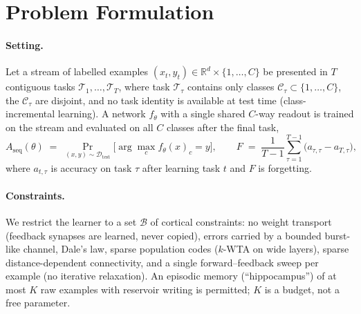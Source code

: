 \documentclass{article}
\newcommand{\kwta}{$k$-WTA}
\begin{document}
\begin{abstract}
and gives way to the backpropagation references at large ones. On split CIFAR-10 the system
leads offline rehearsal and BP+ER but trails ER-ACE and DER++ by two to three points, and a
substrate decomposition on feature inputs attributes the gap to BP+ER to dense activation
rather than to credit assignment. The construction is not tied to the local learner: on a
backpropagation network with $k$-winner-take-all hidden layers under the same schedule,
refractory rotation adds half a point in five epochs and three in a single pass, and
isolation again costs nothing on top of it. Finally, a drive-referenced controller for the
rule's
synaptic decay replaces per-dataset tuning with a single ratio target and, with locally
learned skip synapses, holds a five-hidden-layer network at the two-layer level.
\end{abstract}

\section{Problem Formulation}
\label{sec:problem}

\paragraph{Setting.}
Let a stream of labelled examples $(x_t, y_t) \in \mathbb{R}^{d}\times\{1,\dots,C\}$ be presented
in $T$ contiguous tasks $\mathcal{T}_1,\dots,\mathcal{T}_T$, where task $\mathcal{T}_\tau$
contains only classes $\mathcal{C}_\tau \subset \{1,\dots,C\}$, the $\mathcal{C}_\tau$ are
disjoint, and no task identity is available at test time (class-incremental learning). A network
$f_\theta$ with a single shared $C$-way readout is trained on the stream and evaluated on all $C$
classes after the final task,
\begin{equation}
A_{\mathrm{seq}}(\theta) \;=\; \Pr_{(x,y)\sim\mathcal{D}_{\mathrm{test}}}\!\big[\arg\max_c f_\theta(x)_c = y\big],
\qquad
F \;=\; \frac{1}{T-1}\sum_{\tau=1}^{T-1}\big(a_{\tau,\tau} - a_{T,\tau}\big),
\end{equation}
where $a_{t,\tau}$ is accuracy on task $\tau$ after learning task $t$ and $F$ is forgetting.

\paragraph{Constraints.}
We restrict the learner to a set $\mathcal{B}$ of cortical constraints: no weight transport
(feedback synapses are learned, never copied), errors carried by a bounded burst-like channel,
Dale's law, sparse population codes (\kwta{} on wide layers), sparse distance-dependent
connectivity, and a single forward--feedback sweep per example (no iterative relaxation). An
episodic memory (``hippocampus'') of at most $K$ raw examples with reservoir writing
\citep{vitter1985} is permitted;
$K$ is a budget, not a free parameter.
\end{document}

